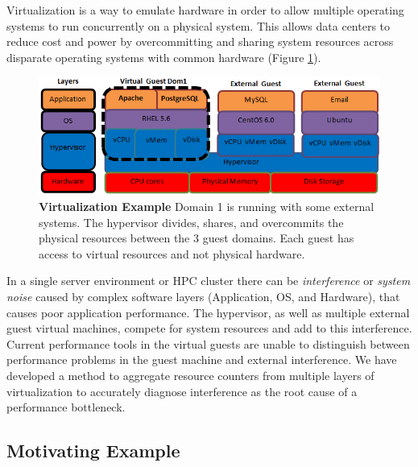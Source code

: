Virtualization is a way to emulate hardware in order to allow multiple operating systems to run concurrently on a physical system.  This allows data centers to reduce cost and power by overcommitting and sharing system resources across disparate operating systems with common hardware  (Figure \ref{virtStack}).

\begin{figure}[!h]
  \begin{center}
  \includegraphics[width=6in]{images/LayersAll.png}
  \caption{\textbf{Virtualization Example}  Domain 1 is running with some external systems.  The hypervisor  divides, shares, and overcommits the physical resources between the 3 guest domains.  Each guest has access to virtual resources and not physical hardware.}
  \label{virtStack}
  \end{center}
\end{figure}

In a single server environment or HPC cluster there can be \emph{interference} \cite{paul} or \emph{system noise}\cite{tsafrir} caused by complex software layers (Application, OS, and Hardware), that causes poor application performance.  
The hypervisor, as well as multiple external guest virtual machines, compete for system resources and add to this interference.  Current performance tools in the virtual guests are unable to distinguish between performance problems in the guest machine and external interference.  We have developed a method to aggregate resource counters from multiple layers of virtualization to accurately diagnose interference as the root cause of a performance bottleneck. 

\subsection{Motivating Example}


